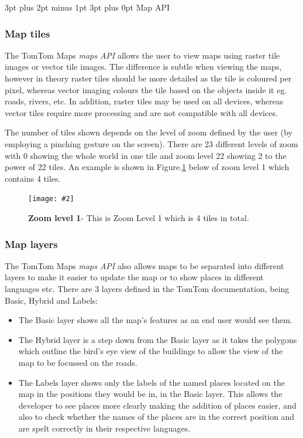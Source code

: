 \documentclass[12pt,a4paper]{article}
\makeatletter
\newcommand{\figuremacro}[5]{
    \begin{figure}[#1]
        \centering
        \texttt{[image: \#2]}
        \caption[#3]{\textbf{#3}#4}
        \label{fig:#2}
    \end{figure}
}
\renewcommand\subsection{\@startsection {subsection}{1}{0mm} %
                               {3pt plus 2pt minus 1pt} %
                               {3pt plus 0pt} %
                               {\normalfont\bfseries}}
\makeatother
\begin{document}
\newpage
\subsection{Map API}
\subsubsection{Map tiles}
The TomTom Maps \textit{maps API} allows the user to view maps using raster tile images or vector tile images. The difference is subtle when viewing the maps, however in theory raster tiles should be more detailed as the tile is coloured per pixel, whereas vector imaging colours the tile based on the objects inside it eg. roads, rivers, etc. In addition, raster tiles may be used on all devices, whereas vector tiles require more processing and are not compatible with all devices. 

The number of tiles shown depends on the level of zoom defined by the user (by employing a pinching gesture on the screen). There are 23 different levels of zoom with 0 showing the whole world in one tile and zoom level 22 showing 2 to the power of 22 tiles. An example is shown in Figure.\ref{fig:TomTomZoom1} below of zoom level 1 which contains 4 tiles.

\figuremacro{h}{TomTomZoom1}{Zoom level 1}{- This is Zoom Level 1 which is 4 tiles in total.}{0.8} 

\subsubsection{Map layers}
The TomTom Maps \textit{maps API} also allows maps to be separated into different layers to make it easier to update the map or to show places in different languages etc. There are 3 layers defined in the TomTom documentation, being Basic, Hybrid and Labels: 

\begin{itemize}
	\item The Basic layer shows all the map's features as an end user would see them.
	
	\item The Hybrid layer is a step down from the Basic layer as it takes the polygons which outline the bird's eye view of the buildings to allow the view of the map to be focussed on the roads. 
	
	\item The Labels layer shows only the labels of the named places located on the map in the positions they would be in, in the Basic layer. This allows the developer to see places more clearly making the addition of places easier, and also to check whether the names of the places are in the correct position and are spelt correctly in their respective languages.
\end{itemize}
\end{document}
